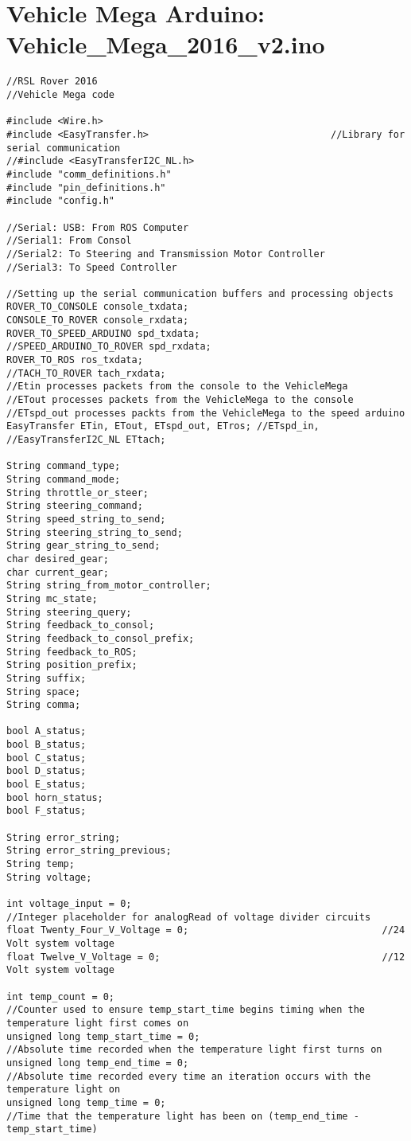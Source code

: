 \section*{Vehicle Mega Arduino: Vehicle\_Mega\_2016\_v2.ino}
\begin{lstlisting}[breaklines=true,basicstyle=\tiny]
//RSL Rover 2016
//Vehicle Mega code

#include <Wire.h>
#include <EasyTransfer.h>                                //Library for serial communication
//#include <EasyTransferI2C_NL.h>
#include "comm_definitions.h"
#include "pin_definitions.h"
#include "config.h"

//Serial: USB: From ROS Computer
//Serial1: From Consol
//Serial2: To Steering and Transmission Motor Controller
//Serial3: To Speed Controller

//Setting up the serial communication buffers and processing objects
ROVER_TO_CONSOLE console_txdata;
CONSOLE_TO_ROVER console_rxdata;
ROVER_TO_SPEED_ARDUINO spd_txdata;
//SPEED_ARDUINO_TO_ROVER spd_rxdata;
ROVER_TO_ROS ros_txdata;
//TACH_TO_ROVER tach_rxdata;
//Etin processes packets from the console to the VehicleMega
//ETout processes packets from the VehicleMega to the console
//ETspd_out processes packts from the VehicleMega to the speed arduino
EasyTransfer ETin, ETout, ETspd_out, ETros; //ETspd_in,
//EasyTransferI2C_NL ETtach;

String command_type;   
String command_mode;
String throttle_or_steer;
String steering_command;
String speed_string_to_send;
String steering_string_to_send;
String gear_string_to_send;
char desired_gear;
char current_gear;
String string_from_motor_controller;
String mc_state;
String steering_query;
String feedback_to_consol;
String feedback_to_consol_prefix;
String feedback_to_ROS;
String position_prefix;
String suffix;
String space;
String comma;

bool A_status;
bool B_status;
bool C_status;
bool D_status;
bool E_status;
bool horn_status;
bool F_status;

String error_string;
String error_string_previous;
String temp;
String voltage;

int voltage_input = 0;                                            //Integer placeholder for analogRead of voltage divider circuits
float Twenty_Four_V_Voltage = 0;                                  //24 Volt system voltage
float Twelve_V_Voltage = 0;                                       //12 Volt system voltage

int temp_count = 0;                                               //Counter used to ensure temp_start_time begins timing when the temperature light first comes on
unsigned long temp_start_time = 0;                                //Absolute time recorded when the temperature light first turns on
unsigned long temp_end_time = 0;                                  //Absolute time recorded every time an iteration occurs with the temperature light on
unsigned long temp_time = 0;                                      //Time that the temperature light has been on (temp_end_time - temp_start_time)


\end{lstlisting}
